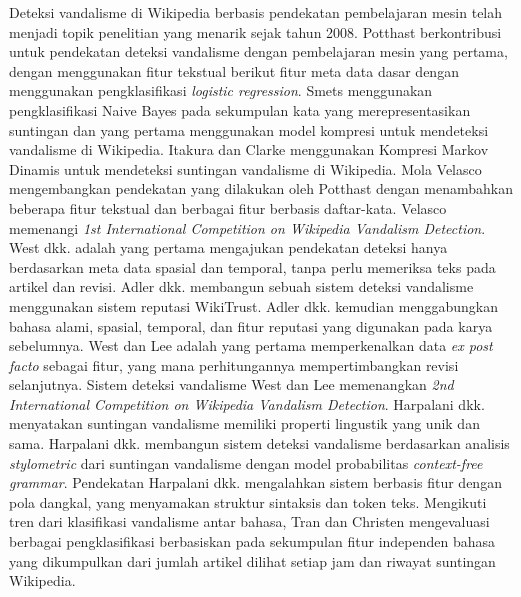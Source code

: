 Deteksi vandalisme di Wikipedia berbasis pendekatan pembelajaran mesin telah
menjadi topik penelitian yang menarik sejak tahun 2008.
Potthast \cite{potthast2008automatic} berkontribusi untuk pendekatan deteksi
vandalisme dengan pembelajaran mesin yang pertama, dengan menggunakan fitur
tekstual berikut fitur meta data dasar dengan menggunakan pengklasifikasi
\textit{logistic regression}.
Smets \cite{smets08automaticvandalism} menggunakan pengklasifikasi Naive Bayes
pada sekumpulan kata yang merepresentasikan suntingan dan yang pertama
menggunakan model kompresi untuk mendeteksi vandalisme di Wikipedia.
Itakura dan Clarke \cite{itakura2009using} menggunakan Kompresi Markov Dinamis
untuk mendeteksi suntingan vandalisme di Wikipedia.
Mola Velasco \cite{mola2012wikipedia} mengembangkan pendekatan yang dilakukan
oleh Potthast \cite{potthast2008automatic} dengan menambahkan beberapa fitur
tekstual dan berbagai fitur berbasis daftar-kata.
Velasco memenangi \textit{1st International Competition on Wikipedia Vandalism
Detection}.  West dkk. \cite{west2011multilingual} adalah yang pertama
mengajukan pendekatan deteksi hanya berdasarkan meta data
spasial dan temporal, tanpa perlu memeriksa teks pada artikel dan revisi.
Adler dkk. \cite{adler2010detecting} membangun sebuah sistem deteksi vandalisme
menggunakan sistem reputasi WikiTrust.
Adler dkk. \cite{adler2011wikipedia} kemudian menggabungkan bahasa alami,
spasial, temporal, dan fitur reputasi yang digunakan pada karya sebelumnya.
West dan Lee \cite{west2011multilingual} adalah yang pertama memperkenalkan
data \textit{ex post facto} sebagai fitur, yang mana perhitungannya
mempertimbangkan revisi selanjutnya.
Sistem deteksi vandalisme West dan Lee memenangkan \textit{2nd International
Competition on Wikipedia Vandalism Detection}.
Harpalani dkk. \cite{harpalani2011language} menyatakan suntingan vandalisme
memiliki properti lingustik yang unik dan sama.
Harpalani dkk. membangun sistem deteksi vandalisme berdasarkan analisis
\textit{stylometric} dari suntingan vandalisme dengan model probabilitas
\textit{context-free grammar}.
Pendekatan Harpalani dkk. mengalahkan sistem berbasis fitur dengan pola
dangkal, yang menyamakan struktur sintaksis dan token teks.
Mengikuti tren dari klasifikasi vandalisme antar bahasa, Tran dan Christen
\cite{tran2013cross} mengevaluasi berbagai pengklasifikasi berbasiskan pada
sekumpulan fitur independen bahasa yang dikumpulkan dari jumlah artikel dilihat
setiap jam dan riwayat suntingan Wikipedia.

